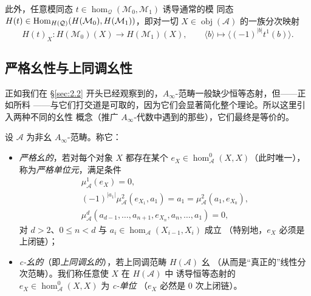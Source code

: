 此外，任意模同态 $t\in\hom_{\mathcal Q}(\mathcal M_0,\mathcal M_1)$ 诱导通常的模
同态 $H(t)\in\operatorname{Hom}_{H(\mathcal Q)}(H(\mathcal M_0),H(\mathcal M_1))$，即对一切
$X\in\operatorname{obj}(\mathcal A)$ 的一族分次映射
\[
  H(t)_X:H(\mathcal M_0)(X)\to H(\mathcal M_1)(X),\qquad
  \langle b\rangle\longmapsto\bigl\langle(-1)^{|b|}t^1(b)\bigr\rangle.
\]

\subsection{严格幺性与上同调幺性}\label{sec:2.7}

正如我们在 §\ref{sec:2.2} 开头已经观察到的，$A_\infty$-范畴一般缺少恒等态射，但——正如所料
——与它们打交道是可取的，因为它们会显著简化整个理论。所以这里引入两种不同的幺性
概念（推广 $A_\infty$-代数中遇到的那些），它们最终是等价的。

\begin{Def}\label{def:2.23}
设 $\mathcal A$ 为非幺 $A_\infty$-范畴。称它：
\begin{itemize}
  \item \emph{严格幺的}，若对每个对象 $X$ 都存在某个 $e_X\in\hom^0_{\mathcal A}
        (X,X)$（此时唯一），称为\emph{严格单位元}，满足条件
        \begin{equation}\label{eq:2.28}
          \begin{gathered}
            \mu^1_{\mathcal A}(e_X)=0,\\
            (-1)^{|a_1|}\mu^2_{\mathcal A}(e_{X_1},a_1)=a_1
            =\mu^2_{\mathcal A}(a_1,e_{X_0}),\\
            \mu^d_{\mathcal A}(a_{d-1},\dots,a_{n+1},e_{X_n},a_n,\dots,a_1)=0,
          \end{gathered}
        \end{equation}
        对 $d>2$、$0\le n<d$ 与 $a_i\in\hom_{\mathcal A}(X_{i-1},X_i)$ 成立
        （特别地，$e_X$ 必须是上闭链）；
  \item \emph{c-幺的}（即\emph{上同调幺的}），若上同调范畴 $H(\mathcal A)$ 幺
        （从而是“真正的”线性分次范畴）。我们称任意使 $X$ 在 $H(\mathcal A)$ 中
        诱导恒等态射的 $e_X\in\hom^0_{\mathcal A}(X,X)$ 为 \emph{c-单位}
        （$e_X$ 必然是 0 次上闭链）。
\end{itemize}
\end{Def}

